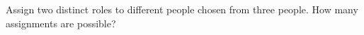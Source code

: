 Assign two distinct roles to different people chosen from three people. How many assignments are possible?
